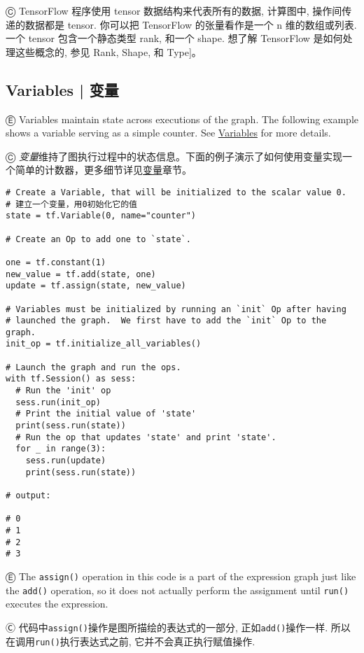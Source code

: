 Ⓒ TensorFlow 程序使用 tensor 数据结构来代表所有的数据, 计算图中, 操作间传递的数据都是 tensor. 你可以把 TensorFlow 的张量看作是一个 n 维的数组或列表. 一个 tensor 包含一个静态类型 rank, 和一个 shape. 想了解 TensorFlow 是如何处理这些概念的, 参见 Rank, Shape, 和 Type]。


%
\subsection{Variables  |  变量}

Ⓔ \textcolor{etc}{Variables maintain state across executions of the graph. The following example shows a variable serving as a simple counter. See \hyperref[variables]{Variables} for more details.}

Ⓒ \emph{变量}维持了图执行过程中的状态信息。下面的例子演示了如何使用变量实现一个简单的计数器，更多细节详见\hyperref[variables]{变量}章节。

\begin{lstlisting}
# Create a Variable, that will be initialized to the scalar value 0.
# 建立一个变量，用0初始化它的值
state = tf.Variable(0, name="counter")

# Create an Op to add one to `state`.

one = tf.constant(1)
new_value = tf.add(state, one)
update = tf.assign(state, new_value)

# Variables must be initialized by running an `init` Op after having
# launched the graph.  We first have to add the `init` Op to the graph.
init_op = tf.initialize_all_variables()

# Launch the graph and run the ops.
with tf.Session() as sess:
  # Run the 'init' op
  sess.run(init_op)
  # Print the initial value of 'state'
  print(sess.run(state))
  # Run the op that updates 'state' and print 'state'.
  for _ in range(3):
    sess.run(update)
    print(sess.run(state))

# output:

# 0
# 1
# 2
# 3
\end{lstlisting}

Ⓔ \textcolor{etc}{The \lstinline{assign()} operation in this code is a part of the expression graph just like the \lstinline{add()} operation, so it does not actually perform the assignment until \lstinline{run()} executes the expression.}

Ⓒ 代码中\lstinline{assign()}操作是图所描绘的表达式的一部分, 正如\lstinline {add()}操作一样. 所以在调用\lstinline {run()}执行表达式之前, 它并不会真正执行赋值操作.

